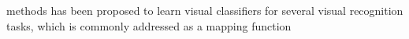 \documentclass[runningheads]{llncs}
\begin{document}
methods has been proposed to learn visual classifiers for several visual recognition tasks, which is commonly addressed as a mapping function %
\end{document}
